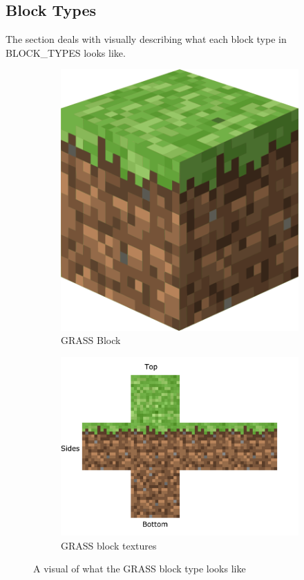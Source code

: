 \documentclass[12pt, titlepage]{article}
\begin{document}
\subsection{Block Types}
The section deals with visually describing what each block type in BLOCK\_TYPES looks like.

\begin{figure}[!h]
  \begin{subfigure}[b]{0.25\textwidth}
    \includegraphics[width=\textwidth]{GrassBlock.png}
    \caption{GRASS Block}
    \label{fig:f1}
  \end{subfigure}
  \hfill
  \begin{subfigure}[b]{0.4\textwidth}
    \includegraphics[width=\textwidth]{GrassTextures.png}
    \caption{GRASS block textures}
    \label{fig:f2}
  \end{subfigure}
  \caption{A visual of what the GRASS block type looks like}
\end{figure}
\end{document}
